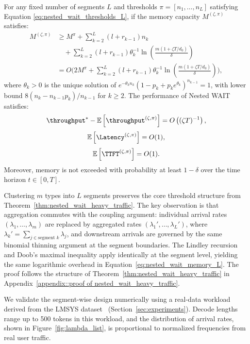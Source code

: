 \begin{theorem}
\label{thm:nested_wait_heavy_traffic, any segment}
For any fixed number of segments $L$ and thresholds $\pi = [n_1, \dots, n_L]$ satisfying Equation \eqref{eq:nested_wait_thresholds_L}, if the memory capacity $M^{(\zeta, \pi)}$ satisfies:
\begin{equation}
    \label{eq:nested_wait_memory_L}
    \begin{aligned}
M^{(\zeta, \pi)}
&\geq M^\pi
+ \sum_{k=2}^L (l + r_{k-1}) n_k \\
&\quad
+ \sum_{k=2}^L (l + r_{k-1}) \theta_k^{-1}
\ln\left( \frac{m(1+\zeta T/d_0)}{\delta} \right) \\
&= O\biggl( 2M^\pi
+ \sum_{k=2}^L (l + r_{k-1}) \theta_k^{-1}
\ln\left( \frac{m(1+\zeta T/d_0)}{\delta} \right) \biggr),
    \end{aligned}
\end{equation}
where $\theta_k>0$ is the unique solution of \(e^{-\theta_k n_k}(1-p_k+p_ke^{\theta_k})^{n_{k-1}}=1\), with lower bound $8(n_k-n_{k-1}p_k)/n_{k-1}$ for \(k\ge2\).
The performance of Nested WAIT satisfies:
$$\throughput^* - \mathbb{E}\left[ \throughput^{(\zeta, \pi)} \right] = O\left( (\zeta T)^{-1} \right),$$
$$\mathbb{E}\left[ \Latency^{(\zeta, \pi)} \right] = O(1),$$
$$\mathbb{E}\left[ \TTFT^{(\zeta, \pi)} \right] = O(1).$$
Moreover, memory is not exceeded with probability at least \( 1 - \delta \) over the time horizon \(t \in [0,T]\).
\end{theorem}

Clustering $m$ types into $L$ segments preserves the core threshold structure from Theorem~\ref{thm:nested_wait_heavy_traffic}. The key observation is that aggregation commutes with the coupling argument: individual arrival rates $(\lambda_1, \dots, \lambda_m)$ are replaced by aggregated rates $(\lambda_1', \dots, \lambda_L')$, where $\lambda_k' = \sum_{j \in \text{segment } k} \lambda_j$, and downstream arrivals are governed by the same binomial thinning argument at the segment boundaries. The Lindley recursion and Doob's maximal inequality apply identically at the segment level, yielding the same logarithmic overhead in Equation~\eqref{eq:nested_wait_memory_L}. The proof follows the structure of Theorem~\ref{thm:nested_wait_heavy_traffic} in Appendix~\ref{appendix::proof of nested_wait_heavy_traffic}.

We validate the segment-wise design numerically using a real-data workload derived from the LMSYS dataset~\cite{zheng2023lmsys} (Section~\ref{sec:experiments}). Decode lengths range up to 500 tokens in this workload, and the distribution of arrival rates, shown in Figure~\ref{fig:lambda_list}, is proportional to normalized frequencies from real user traffic.


